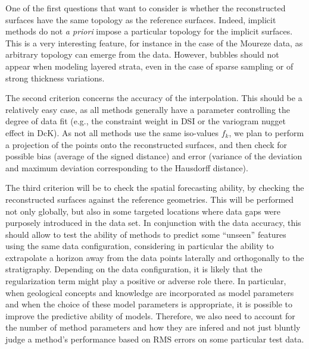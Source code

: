 \documentclass[final]{ring20}
\begin{document}

One of the first questions that want to consider is whether the reconstructed surfaces have the same topology as the reference surfaces. Indeed, implicit methods do not \textit{a priori} impose a particular topology for the implicit surfaces. This is a very interesting feature, for instance in the case of the Moureze data, as arbitrary topology can emerge from the data. However, bubbles should not appear when modeling layered strata, even in the case of sparse sampling or of strong thickness variations. 


The second criterion concerns the accuracy of the interpolation. This should be a relatively easy case, as all methods generally have a parameter controlling the degree of data fit (e.g., the constraint weight in DSI or the variogram nugget effect in DcK). As not all methods use the same iso-values $f_k$, we plan to perform a projection of the points onto the reconstructed surfaces, and then check for possible bias (average of the signed distance) and error (variance of the deviation and maximum deviation corresponding to the Hausdorff distance). 

The third criterion will be to check the spatial forecasting ability, by checking the reconstructed surfaces against the reference geometries. This will be performed not only globally, but also in some targeted locations where data gaps were purposely introduced in the data set. In conjunction with the data accuracy, this should allow to test the ability of methods to predict some ``unseen'' features using the same data configuration, considering in particular the ability to extrapolate a horizon away from the data points laterally and orthogonally to the stratigraphy. Depending on the data configuration, it is likely that the regularization term might play a positive or adverse role there. In particular, when geological concepts and knowledge are incorporated as model parameters \citep[e.g.,][]{Laurent2016EaPSL,Grose2017JSG,Grose2018JGRSE,Grose2019JoSG} and when the choice of these model parameters is appropriate, it is possible to improve the predictive ability of models. Therefore, we also need to account for the number of method parameters and how they are infered and not just bluntly judge a method's performance based on RMS errors on some particular test data.  
\end{document}
